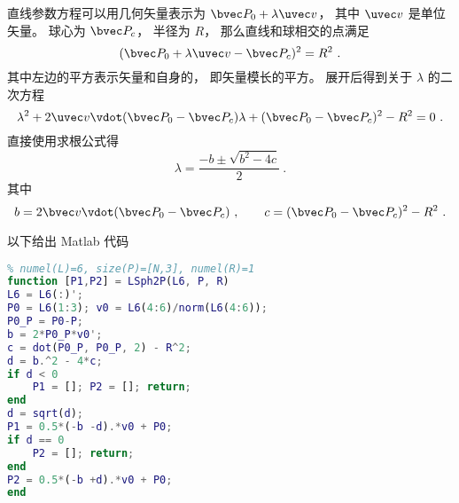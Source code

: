 

直线参数方程可以用几何矢量表示为 $\bvec P_0 + \lambda \uvec v$， 其中 $\uvec v$ 是单位矢量。 球心为 $\bvec P_c$， 半径为 $R$， 那么直线和球相交的点满足
\begin{equation}
(\bvec P_0 + \lambda \uvec v - \bvec P_c)^2 = R^2~.
\end{equation}
其中左边的平方表示矢量和自身的， 即矢量模长的平方。 展开后得到关于 $\lambda$ 的二次方程
\begin{equation}
\lambda^2 + 2\uvec v \vdot (\bvec P_0 - \bvec P_c) \lambda + (\bvec P_0 - \bvec P_c)^2 - R^2 = 0~.
\end{equation}
直接使用求根公式得
\begin{equation}
\lambda = \frac{-b \pm \sqrt{b^2 - 4c}}{2}~.
\end{equation}
其中
\begin{equation}
b = 2\bvec v \vdot (\bvec P_0 - \bvec P_c)~,
\qquad
c = (\bvec P_0 - \bvec P_c)^2 - R^2~.
\end{equation}

以下给出 Matlab 代码
\begin{lstlisting}[language=matlab, caption=LSph2P.m]
% 计算直线和球的焦点
% numel(L)=6, size(P)=[N,3], numel(R)=1
function [P1,P2] = LSph2P(L6, P, R)
L6 = L6(:)';
P0 = L6(1:3); v0 = L6(4:6)/norm(L6(4:6));
P0_P = P0-P;
b = 2*P0_P*v0';
c = dot(P0_P, P0_P, 2) - R^2;
d = b.^2 - 4*c;
if d < 0
    P1 = []; P2 = []; return;
end
d = sqrt(d);
P1 = 0.5*(-b -d).*v0 + P0;
if d == 0
    P2 = []; return;
end
P2 = 0.5*(-b +d).*v0 + P0;
end
\end{lstlisting}
